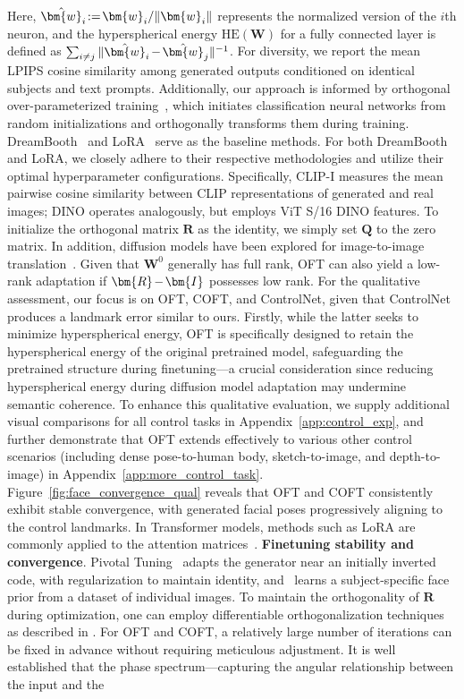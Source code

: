 {Here, $\thickmuskip=2mu \medmuskip=2mu \hat{\bm{w}}_i:=\bm{w}_i/\|\bm{w}_i\|$ represents the normalized version of the $i$th neuron, and the hyperspherical energy $\text{HE}(\bm{W})$ for a fully connected layer is defined as $\thickmuskip=2mu \medmuskip=2mu \sum_{i\neq j} \|\hat{\bm{w}}_i-\hat{\bm{w}}_j\|^{-1}$. For diversity, we report the mean LPIPS cosine similarity among generated outputs conditioned on identical subjects and text prompts. Additionally, our approach is informed by orthogonal over-parameterized training~\cite{liu2021orthogonal}, which initiates classification neural networks from random initializations and orthogonally transforms them during training. DreamBooth~\cite{ruiz2023dreambooth} and LoRA~\cite{hulora2022} serve as the baseline methods. For both DreamBooth and LoRA, we closely adhere to their respective methodologies and utilize their optimal hyperparameter configurations. Specifically, CLIP-I measures the mean pairwise cosine similarity between CLIP representations of generated and real images; DINO operates analogously, but employs ViT S/16 DINO features. To initialize the orthogonal matrix $\bm{R}$ as the identity, we simply set $\bm{Q}$ to the zero matrix. In addition, diffusion models have been explored for image-to-image translation~\cite{saharia2022palette,voynov2022sketch,wang2022pretraining}. Given that $\bm{W}^0$ generally has full rank, OFT can also yield a low-rank adaptation if $\thickmuskip=2mu \medmuskip=2mu \bm{R}-\bm{I}$ possesses low rank. For the qualitative assessment, our focus is on OFT, COFT, and ControlNet, given that ControlNet produces a landmark error similar to ours. Firstly, while the latter seeks to minimize hyperspherical energy, OFT is specifically designed to retain the hyperspherical energy of the original pretrained model, safeguarding the pretrained structure during finetuning—a crucial consideration since reducing hyperspherical energy during diffusion model adaptation may undermine semantic coherence. To enhance this qualitative evaluation, we supply additional visual comparisons for all control tasks in Appendix~\ref{app:control_exp}, and further demonstrate that OFT extends effectively to various other control scenarios (including dense pose-to-human body, sketch-to-image, and depth-to-image) in Appendix~\ref{app:more_control_task}. Figure~\ref{fig:face_convergence_qual} reveals that OFT and COFT consistently exhibit stable convergence, with generated facial poses progressively aligning to the control landmarks. In Transformer models, methods such as LoRA are commonly applied to the attention matrices~\cite{hulora2022}. \textbf{Finetuning stability and convergence}. Pivotal Tuning~\cite{roich2022pivotal} adapts the generator near an initially inverted code, with regularization to maintain identity, and~\cite{nitzan2022mystyle} learns a subject-specific face prior from a dataset of individual images. To maintain the orthogonality of $\bm{R}$ during optimization, one can employ differentiable orthogonalization techniques as described in \cite{liu2021orthogonal,lezcano2019cheap}. For OFT and COFT, a relatively large number of iterations can be fixed in advance without requiring meticulous adjustment. It is well established that the phase spectrum—capturing the angular relationship between the input and the }
